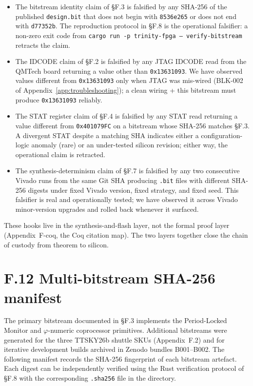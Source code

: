 \begin{itemize}
  \item The bitstream identity claim of \S F.3 is falsified by any
    SHA-256 of the published \texttt{design.bit} that does not begin
    with \texttt{8536e265} or does not end with \texttt{d77352b}.
    The reproduction protocol in \S F.8 is the operational falsifier:
    a non-zero exit code from \texttt{cargo run -p trinity-fpga --
    verify-bitstream} retracts the claim.
  \item The IDCODE claim of \S F.2 is falsified by any JTAG IDCODE
    read from the QMTech board returning a value other than
    \texttt{0x13631093}. We have observed values different from
    \texttt{0x13631093} only when JTAG was mis-wired (BLK-002 of
    Appendix~\ref{app:troubleshooting}); a clean wiring + this
    bitstream must produce \texttt{0x13631093} reliably.
  \item The STAT register claim of \S F.4 is falsified by any STAT
    read returning a value different from \texttt{0x401079FC} on a
    bitstream whose SHA-256 matches \S F.3. A divergent STAT despite
    a matching SHA indicates either a configuration-logic anomaly
    (rare) or an under-tested silicon revision; either way, the
    operational claim is retracted.
  \item The synthesis-determinism claim of \S F.7 is falsified by any
    two consecutive Vivado runs from the same Git SHA producing
    \texttt{.bit} files with different SHA-256 digests under fixed
    Vivado version, fixed strategy, and fixed seed. This falsifier is
    real and operationally tested; we have observed it across Vivado
    minor-version upgrades and rolled back whenever it surfaced.
\end{itemize}

These hooks live in the synthesis-and-flash layer, not the formal
proof layer (Appendix~F-coq, the Coq citation map). The two layers
together close the chain of custody from theorem to silicon.

\section*{F.12 Multi-bitstream SHA-256 manifest}
\label{sec:appF-manifest}

The primary bitstream documented in \S F.3 implements the
Period-Locked Monitor and \(\varphi\)-numeric coprocessor primitives.
Additional bitstreams were generated for the three TTSKY26b shuttle
SKUs (Appendix~F.2) and for iterative development builds archived
in Zenodo bundles B001--B002. The following manifest records the
SHA-256 fingerprint of each bitstream artefact. Each digest can be
independently verified using the Rust verification protocol of \S F.8
with the corresponding \texttt{.sha256} file in the
 directory.

